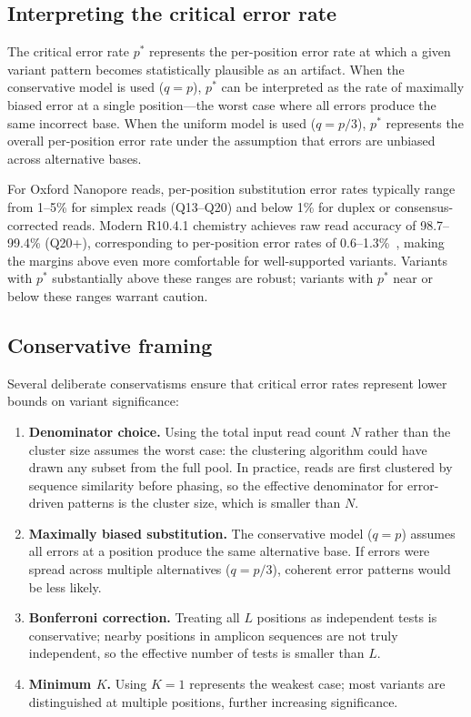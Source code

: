 \documentclass[11pt]{article}
\begin{document}
\subsection{Interpreting the critical error rate}

The critical error rate $p^*$ represents the per-position error rate at which a
given variant pattern becomes statistically plausible as an artifact. When the
conservative model is used ($q = p$), $p^*$ can be interpreted as the rate of
maximally biased error at a single position---the worst case where all errors
produce the same incorrect base. When the uniform model is used ($q = p/3$),
$p^*$ represents the overall per-position error rate under the assumption that
errors are unbiased across alternative bases.

For Oxford Nanopore reads, per-position substitution error rates typically
range from 1--5\% for simplex reads (Q13--Q20) and below 1\% for duplex or
consensus-corrected reads. Modern R10.4.1 chemistry achieves raw read accuracy of
98.7--99.4\% (Q20+), corresponding to per-position error rates of
0.6--1.3\%~\cite{wang2023}, making the margins above even more comfortable for
well-supported variants. Variants with $p^*$ substantially above these ranges
are robust; variants with $p^*$ near or below these ranges warrant caution.

\subsection{Conservative framing}

Several deliberate conservatisms ensure that critical error rates represent lower
bounds on variant significance:

\begin{enumerate}
\item \textbf{Denominator choice.} Using the total input read count $N$ rather
than the cluster size assumes the worst case: the clustering algorithm could have
drawn any subset from the full pool. In practice, reads are first clustered by
sequence similarity before phasing, so the effective denominator for error-driven
patterns is the cluster size, which is smaller than $N$.

\item \textbf{Maximally biased substitution.} The conservative model ($q = p$)
assumes all errors at a position produce the same alternative base. If errors
were spread across multiple alternatives ($q = p/3$), coherent error patterns
would be less likely.

\item \textbf{Bonferroni correction.} Treating all $L$ positions as independent
tests is conservative; nearby positions in amplicon sequences are not truly
independent, so the effective number of tests is smaller than $L$.

\item \textbf{Minimum $K$.} Using $K = 1$ represents the weakest case; most
variants are distinguished at multiple positions, further increasing significance.
\end{enumerate}
\end{document}
